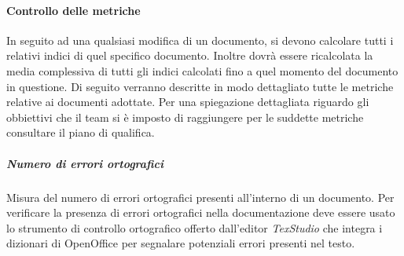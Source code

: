 \paragraph{Controllo delle metriche} \Spazio
In seguito ad una qualsiasi modifica di un documento, si devono calcolare tutti i relativi indici di quel specifico documento. Inoltre dovrà essere ricalcolata la media complessiva di tutti gli indici calcolati fino a quel momento del documento in questione.
Di seguito verranno descritte in modo dettagliato tutte le metriche relative ai documenti adottate. Per una spiegazione dettagliata riguardo gli obbiettivi che il team si è imposto di raggiungere per le suddette metriche consultare il piano di qualifica.

\subparagraph{Numero di errori ortografici}\Spazio
Misura del numero di errori ortografici presenti all'interno di un documento.
Per verificare la presenza di errori ortografici nella documentazione deve essere usato lo strumento di controllo ortografico offerto dall'editor \emph{TexStudio} che integra i dizionari di OpenOffice per segnalare potenziali errori presenti nel testo.

